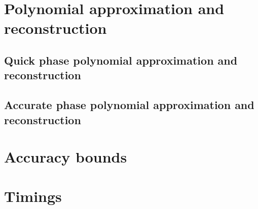 \section{Polynomial approximation and reconstruction}\label{sec:asinpolynomial}

\subsection{Quick phase polynomial approximation and reconstruction}\label{subsec:asinquickpolynomial}

\subsection{Accurate phase polynomial approximation and reconstruction}\label{subsec:asinquickpolynomial}

\section{Accuracy bounds}\label{sec:asinaccuracy}

\section{Timings}\label{sec:asintiming}
